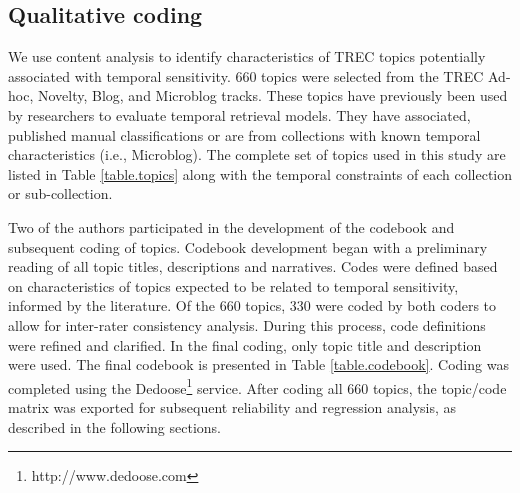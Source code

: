 \documentclass{sig-alternate}
\begin{document}
\subsection{Qualitative coding}
We use content analysis \cite{Krippendorff1980} to identify characteristics of TREC topics potentially associated with temporal sensitivity. 660 topics were selected from the TREC Ad-hoc, Novelty, Blog, and Microblog tracks. These topics have previously been used by researchers to evaluate temporal retrieval models. They have associated, published manual classifications or are from collections with known temporal characteristics (i.e., Microblog). The complete set of topics used in this study are listed in Table \ref{table.topics} along with the temporal constraints of each collection or sub-collection.



Two of the authors participated in the development of the codebook and subsequent coding of topics. Codebook development began with a preliminary reading of all topic titles, descriptions and narratives. Codes were defined based on characteristics of topics expected to be related to temporal sensitivity, informed by the literature. Of the 660 topics, 330 were coded by both coders to allow for inter-rater consistency analysis. During this process, code definitions were refined and clarified. In the final coding, only topic title and description were used. The final codebook is presented in Table \ref{table.codebook}. Coding was completed using the Dedoose\footnote{http://www.dedoose.com} service.  After coding all 660 topics, the topic/code matrix was exported for subsequent reliability and regression analysis, as described in the following sections. 
\end{document}
